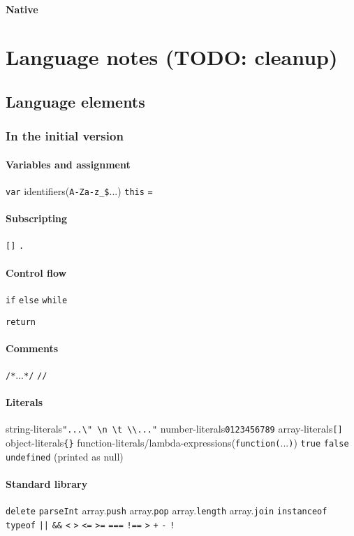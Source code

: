 \subsubsection{Native}


\chapter{Language notes (TODO: cleanup)}
\section{Language elements}

\subsection{In the initial version}

\subsubsection{Variables and assignment}
\verb|var|
identifiers(\verb|A-Za-z_$|...)
\verb|this|
\verb|=|

\subsubsection{Subscripting}
\verb|[]|
\verb|.|

\subsubsection{Control flow}
\verb|if| \verb|else| \verb|while|

\verb|return|

\subsubsection{Comments}
\verb|/*|...\verb|*/|
\verb|//|
\subsubsection{Literals}
string-literals\verb|"...\" \n \t \\..."|
number-literals\verb|0123456789|
array-literals\verb|[]|
object-literals\verb|{}|
function-literals/lambda-expressions(\verb|function(|...\verb|)|)
\verb|true|
\verb|false|
\verb|undefined| (printed as null)

\subsubsection{Standard library}
\verb|delete|
\verb|parseInt|
array.\verb|push|
array.\verb|pop|
array.\verb|length|
array.\verb|join|
\verb|instanceof|
\verb|typeof|
\verb$||$ 
\verb|&&|
\verb|<|
\verb|>|
\verb|<=| 
\verb|>=|
\verb|===|
\verb|!==|
\verb|>|
\verb|+|
\verb|-|
\verb|!|

